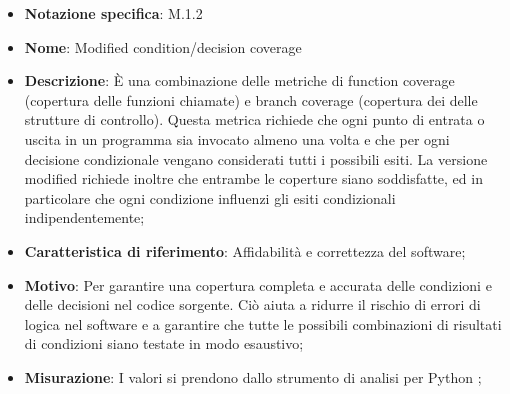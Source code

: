 \begin{itemize}
    \item \textbf{Notazione specifica}: M.1.2
    \item \textbf{Nome}: Modified condition/decision coverage
    \item \textbf{Descrizione}: È una combinazione delle metriche di function coverage (copertura delle funzioni chiamate) e branch coverage (copertura dei  delle strutture di controllo). Questa metrica richiede che ogni punto di entrata o uscita in un programma sia invocato almeno una volta e che per ogni decisione condizionale vengano considerati tutti i possibili esiti. La versione modified richiede inoltre che entrambe le coperture siano soddisfatte, ed in particolare che ogni condizione influenzi gli esiti condizionali indipendentemente;
    \item \textbf{Caratteristica di riferimento}: Affidabilità e correttezza del software;
    \item \textbf{Motivo}: Per garantire una copertura completa e accurata delle condizioni e delle decisioni nel codice sorgente. Ciò aiuta a ridurre il rischio di errori di logica nel software e a garantire che tutte le possibili combinazioni di risultati di condizioni siano testate in modo esaustivo;
    \item \textbf{Misurazione}: I valori si prendono dallo strumento di analisi per Python ;

\end{itemize}
